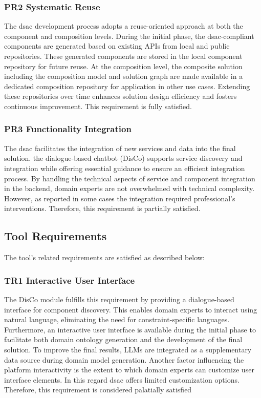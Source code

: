 \subsubsection*{PR2 Systematic Reuse}
The \gls{dsac} development process adopts a reuse-oriented approach at both the component and composition levels. During the initial phase, the \gls{dsac}-compliant components are generated based on existing APIs from local and public repositories. These generated components are stored in the local component repository for future reuse. At the composition level, the composite solution including the composition model and solution graph are made available in a dedicated composition repository for application in other use cases. Extending these repositories over time enhances solution design efficiency and fosters continuous improvement. This requirement is fully satisfied.

\subsubsection*{PR3 Functionality Integration}
The \gls{dsac} facilitates the integration of new services and data into the final solution. the dialogue-based chatbot (DisCo) supports service discovery and integration while offering essential guidance to ensure an efficient integration process. By handling the technical aspects of service and component integration in the backend, domain experts are not overwhelmed with technical complexity. However, as reported in some cases the integration required professional’s interventions. Therefore, this requirement is partially satisfied.

\vspace{-10pt}
\hypertarget{sec:evaluation.scope-requirements}{%
\subsection{Tool Requirements}\label{sec:evaluation.scope-requirements}}
\vspace{10pt}

The tool’s related requirements are satisfied as described below:
\subsubsection*{TR1 Interactive User Interface}
The DisCo module fulfills this requirement by providing a dialogue-based interface for component discovery. This enables domain experts to interact using natural language, eliminating the need for constraint-specific languages. Furthermore, an interactive user interface is available during the initial phase to facilitate both domain ontology generation and the development of the final solution. To improve the final results, LLMs are integrated as a supplementary data source during domain model generation. Another factor influencing the platform interactivity is the extent to which domain experts can customize user interface elements. In this regard \gls{dsac} offers limited customization options. Therefore, this requirement is considered palatially satisfied

